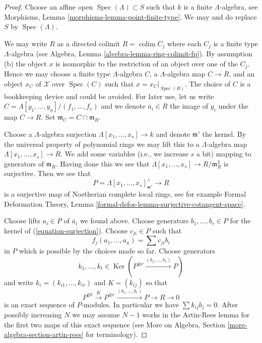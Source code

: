 \documentclass[10pt,a4paper]{amsart}
\theoremstyle{plain}
\theoremstyle{definition}
\theoremstyle{remark}
\numberwithin{equation}{subsection}
\def\colim{\mathop{\mathrm{colim}}\nolimits}
\def\Spec{\mathop{\mathrm{Spec}}}
\def\Ker{\mathop{\mathrm{Ker}}}
\begin{document}
\begin{proof}
Choose an affine open $\Spec(\Lambda) \subset S$ such that $k$ is a finite
$\Lambda$-algebra, see
Morphisms, Lemma \ref{morphisms-lemma-point-finite-type}.
We may and do replace $S$ by $\Spec(\Lambda)$.

\medskip\noindent
We may write $R$ as a directed colimit $R = \colim C_j$ where each
$C_j$ is a finite type $\Lambda$-algebra (see
Algebra, Lemma \ref{algebra-lemma-ring-colimit-fp}).
By assumption (b) the object $x$ is isomorphic to the restriction of
an object over one of the $C_j$. Hence we may choose a finite type
$\Lambda$-algebra $C$, a $\Lambda$-algebra map $C \to R$, and an object
$x_C$ of $\mathcal{X}$ over $\Spec(C)$ such that $x = x_C|_{\Spec(R)}$.
The choice of $C$ is a bookkeeping device and could be avoided.
For later use, let us write $C = \Lambda[y_1, \ldots, y_u]/(f_1, \ldots, f_v)$
and we denote $\overline{a}_i \in R$ the image of $y_i$ under the
map $C \to R$. Set $\mathfrak m_C = C \cap \mathfrak m_R$.

\medskip\noindent
Choose a $\Lambda$-algebra surjection $\Lambda[x_1, \ldots, x_s] \to k$
and denote $\mathfrak m'$ the kernel.
By the universal property of polynomial rings we may lift this
to a $\Lambda$-algebra map $\Lambda[x_1, \ldots, x_s] \to R$.
We add some variables (i.e., we increase $s$ a bit) mapping to generators
of $\mathfrak m_R$. Having done this we see that
$\Lambda[x_1, \ldots, x_s] \to R/\mathfrak m_R^2$ is surjective.
Then we see that
\begin{equation}
\label{equation-surjection}
P = \Lambda[x_1, \ldots, x_s]_{\mathfrak m'}^\wedge \longrightarrow R
\end{equation}
is a surjective map of Noetherian complete local rings, see for example
Formal Deformation Theory, Lemma
\ref{formal-defos-lemma-surjective-cotangent-space}.

\medskip\noindent
Choose lifts $a_i \in P$ of $\overline{a}_i$ we found above.
Choose generators $b_1, \ldots, b_r \in P$ for the kernel of
(\ref{equation-surjection}).
Choose $c_{ji} \in P$ such that
$$
f_j(a_1, \ldots, a_u) = \sum c_{ji} b_i
$$
in $P$ which is possible by the choices made so far. Choose generators
$$
k_1, \ldots, k_t \in
\Ker(P^{\oplus r} \xrightarrow{(b_1, \ldots, b_r)} P)
$$
and write $k_i = (k_{i1}, \ldots, k_{ir})$ and $K = (k_{ij})$
so that
$$
P^{\oplus t} \xrightarrow{K}
P^{\oplus r} \xrightarrow{(b_1, \ldots, b_r)}
P \to R \to 0
$$
is an exact sequence of $P$-modules. In particular we have
$\sum k_{ij} b_j = 0$. After possibly increasing $N$ we may
assume $N - 1$ works in the Artin-Rees lemma for the first two maps of this
exact sequence (see More on Algebra, Section
\ref{more-algebra-section-artin-rees} for terminology).


\end{proof}
\end{document}
